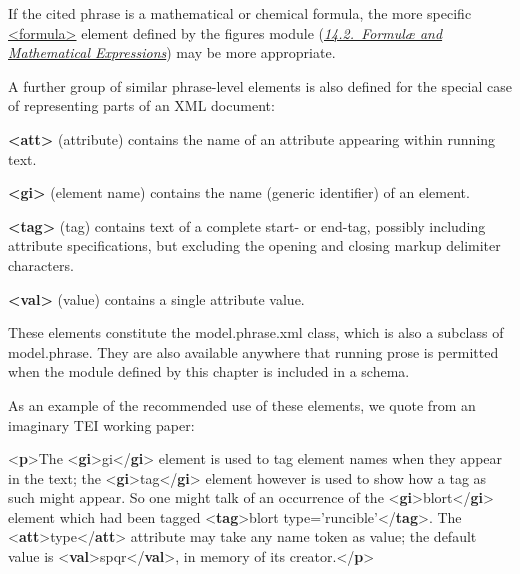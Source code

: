 If the cited phrase is a mathematical or chemical formula, the more specific \hyperref[TEI.formula]{<formula>} element defined by the \textsf{figures} module (\textit{\hyperref[FTFOR]{14.2.\ Formulæ and Mathematical Expressions}}) may be more appropriate.\par
A further group of similar phrase-level elements is also defined for the special case of representing parts of an XML document: 
\begin{sansreflist}
  
\item [\textbf{<att>}] (attribute) contains the name of an attribute appearing within running text.
\item [\textbf{<gi>}] (element name) contains the name (generic identifier) of an element.
\item [\textbf{<tag>}] (tag) contains text of a complete start- or end-tag, possibly including attribute specifications, but excluding the opening and closing markup delimiter characters.
\item [\textbf{<val>}] (value) contains a single attribute value.
\end{sansreflist}
 These elements constitute the \textsf{model.phrase.xml} class, which is also a subclass of \textsf{model.phrase}. They are also available anywhere that running prose is permitted when the module defined by this chapter is included in a schema.\par
As an example of the recommended use of these elements, we quote from an imaginary TEI working paper: \par\bgroup{}\exampleFont \begin{shaded}\noindent\mbox{}{<\textbf{p}>}The {<\textbf{gi}>}gi{</\textbf{gi}>} element is used to tag element\mbox{}\newline 
 names when they appear in the text; the {<\textbf{gi}>}tag{</\textbf{gi}>} element however is used to show how a tag as\mbox{}\newline 
 such might appear. So one might talk of an occurrence of the {<\textbf{gi}>}blort{</\textbf{gi}>} element which had been\mbox{}\newline 
 tagged {<\textbf{tag}>}blort type='runcible'{</\textbf{tag}>}. The {<\textbf{att}>}type{</\textbf{att}>} attribute may take any name token as\mbox{}\newline 
 value; the default value is {<\textbf{val}>}spqr{</\textbf{val}>}, in memory of its creator.{</\textbf{p}>}\end{shaded}\egroup\par \par
